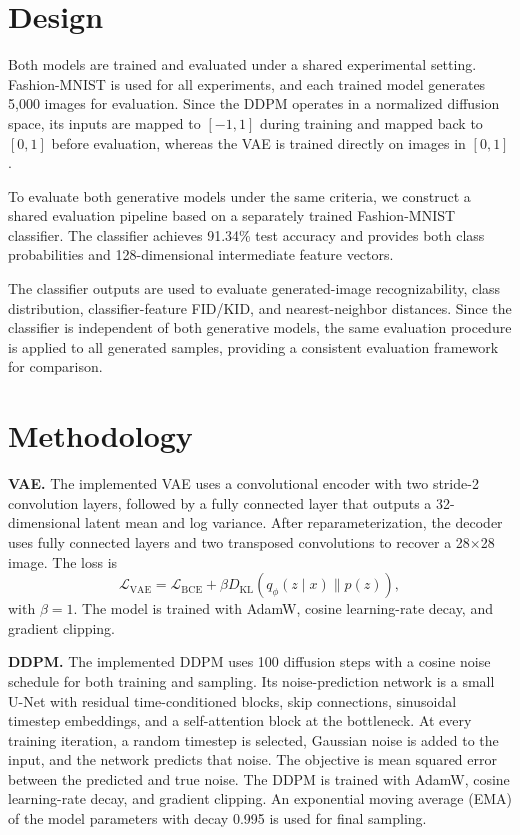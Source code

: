 \documentclass{article}
\begin{document}
\section{Design}

Both models are trained and evaluated under a shared experimental setting. Fashion-MNIST is used for all experiments, and each trained model generates 5,000 images for evaluation. Since the DDPM operates in a normalized diffusion space, its inputs are mapped to $[-1,1]$ during training and mapped back to $[0,1]$ before evaluation, whereas the VAE is trained directly on images in $[0,1]$.

To evaluate both generative models under the same criteria, we construct a shared evaluation pipeline based on a separately trained Fashion-MNIST classifier. The classifier achieves 91.34\% test accuracy and provides both class probabilities and 128-dimensional intermediate feature vectors.

The classifier outputs are used to evaluate generated-image recognizability, class distribution, classifier-feature FID/KID, and nearest-neighbor distances. Since the classifier is independent of both generative models, the same evaluation procedure is applied to all generated samples, providing a consistent evaluation framework for comparison.

\section{Methodology}
\textbf{VAE.} The implemented VAE uses a convolutional encoder with two stride-2 convolution layers, followed by a fully connected layer that outputs a 32-dimensional latent mean and log variance. After reparameterization, the decoder uses fully connected layers and two transposed convolutions to recover a 28$\times$28 image. The loss is
\begin{equation}
 \mathcal{L}_{\mathrm{VAE}}=\mathcal{L}_{\mathrm{BCE}}+\beta D_{\mathrm{KL}}(q_\phi(z\mid x)\|p(z)),
\end{equation}
with $\beta=1$. The model is trained with AdamW, cosine learning-rate decay, and gradient clipping.

\textbf{DDPM.} The implemented DDPM uses 100 diffusion steps with a cosine noise schedule for both training and sampling. Its noise-prediction network is a small U-Net with residual time-conditioned blocks, skip connections, sinusoidal timestep embeddings, and a self-attention block at the bottleneck. At every training iteration, a random timestep is selected, Gaussian noise is added to the input, and the network predicts that noise. The objective is mean squared error between the predicted and true noise. The DDPM is trained with AdamW, cosine learning-rate decay, and gradient clipping. An exponential moving average (EMA) of the model parameters with decay 0.995 is used for final sampling.
\end{document}
